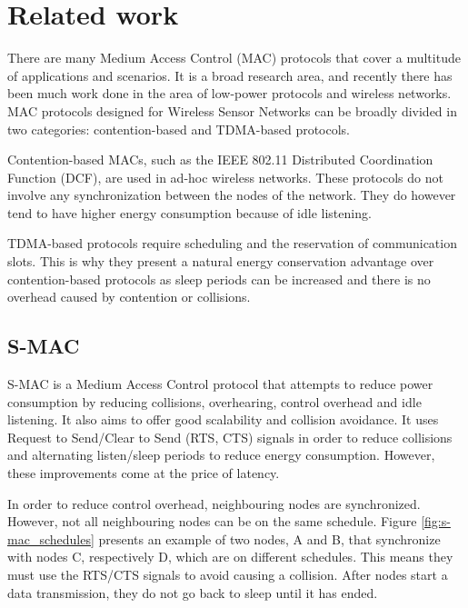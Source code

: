 
\chapter{Related work}

There are many Medium Access Control (MAC) protocols that cover a multitude of
applications and scenarios. It is a broad research area, and recently there
has been much work done in the area of low-power protocols and wireless networks. MAC
protocols designed for Wireless Sensor Networks can be broadly divided in two
categories: contention-based and TDMA-based protocols.

Contention-based MACs, such as the IEEE 802.11 Distributed Coordination
Function\cite{ieee1997wireless} (DCF), are used in ad-hoc wireless networks.
These protocols do not involve any synchronization between the nodes of the
network. They do however tend to have higher energy consumption because of idle
listening.

TDMA-based protocols require scheduling and the reservation of communication
slots. This is why they present a natural energy conservation advantage over
contention-based protocols as sleep periods can be increased and there is no
overhead caused by contention or collisions.

\section{S-MAC}

S-MAC\cite{ye2004medium} is a Medium Access Control protocol that attempts to
reduce power consumption by reducing collisions, overhearing, control overhead
and idle listening. It also aims to offer good scalability and collision
avoidance. It uses Request to Send/Clear to Send (RTS, CTS) signals in order to
reduce collisions and alternating listen/sleep periods to reduce energy
consumption. However, these improvements come at the price of latency. 

In order to reduce control overhead, neighbouring nodes are synchronized.
However, not all neighbouring nodes can be on the same schedule.  Figure
\ref{fig:s-mac_schedules} presents an example of two nodes, A and B, that
synchronize with nodes C, respectively D, which are on different
schedules. This means they must use the RTS/CTS signals to avoid causing a
collision. After nodes start a data transmission, they do not go back to sleep
until it has ended.

